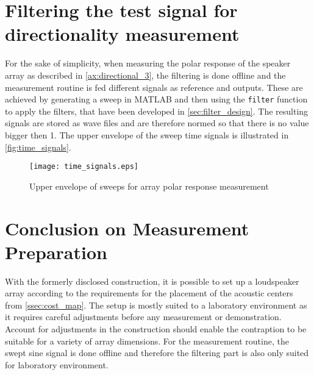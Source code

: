 \section{Filtering the test signal for directionality measurement}\label{sec:signal_filtering}
For the sake of simplicity, when measuring the polar response of the speaker array as described in \autoref{ax:directional_3}, the filtering is done offline and the measurement routine is fed different signals as reference and outputs. These are achieved by generating a sweep in MATLAB and then using the \texttt{filter} function to apply the filters, that have been developed in \autoref{sec:filter_design}. The resulting signals are stored as wave files and are therefore normed so that there is no value bigger then 1.
The upper envelope of the sweep time signals is illustrated in \autoref{fig:time_signals}.
\begin{figure}[H]
	\centering
	\texttt{[image: time\_signals.eps]}
	\caption{Upper envelope of sweeps for array polar response measurement}
	\label{fig:time_signals}
\end{figure}


\section{Conclusion on Measurement Preparation}
With the formerly disclosed construction, it is possible to set up a loudspeaker array according to the requirements for the placement of the acoustic centers from \autoref{ssec:cost_map}. The setup is mostly suited to a laboratory environment as it requires careful adjustments before any measurement or demonstration. Account for adjustments in the construction should enable the contraption to be suitable for a variety of array dimensions. For the measurement routine, the swept sine signal is done offline and therefore the filtering part is also only suited for laboratory environment.
